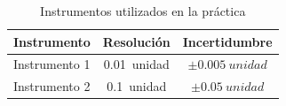 \begin{table}[htbp]
\centering
\caption{Instrumentos utilizados en la práctica}
\label{tab:instrumentos}
\begin{tabular}{lcc}
\toprule
\textbf{Instrumento} & \textbf{Resolución} & \textbf{Incertidumbre} \\
\midrule
Instrumento 1 & \SI{0.01}{unidad} & $\pm \SI{0.005}{unidad}$ \\
Instrumento 2 & \SI{0.1}{unidad} & $\pm \SI{0.05}{unidad}$ \\
\bottomrule
\end{tabular}
\end{table}
